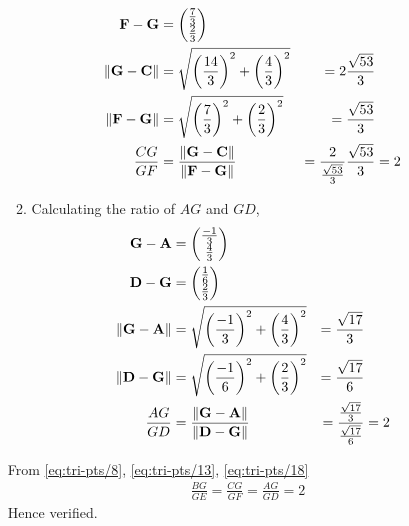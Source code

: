 \documentclass[11pt]{book}
\begin{document}
\begin{enumerate}[label=\thesection.\arabic*.,ref=\thesection.\theenumi]
\begin{enumerate}
\begin{align}
		\label{eq:tri-pts/10} \vec{F}-\vec{G} &= \myvec{\frac{7}{3} \\ \frac{2}{3}} \\
		\label{eq:tri-pts/11} \norm{\vec{G}-\vec{C}} &= \sqrt{\brak{\frac{14}{3}}^{2} + \brak{\frac{4}{3}}^{2}} &= 2\frac{\sqrt{53}}{3} \\  
		\label{eq:tri-pts/12} \norm{\vec{F}-\vec{G}} &= \sqrt{\brak{\frac{7}{3}}^{2} + \brak{\frac{2}{3}}^{2}} &= \frac{\sqrt{53}}{3} \\
		\label{eq:tri-pts/13}\frac{CG}{GF} &= \frac{\norm{\vec{G}-\vec{C}}}{\norm{\vec{F}-\vec{G}}} &= \frac2{\frac{\sqrt{53}}{3}}{\frac{\sqrt{53}}{3}} &= 2		
\end{align}
\item Calculating the ratio of $AG$ and $GD$,
\begin{align}
		\label{eq:tri-pts/14} \vec{G}-\vec{A} &= \myvec{\frac{-1}{3} \\ \frac{4}{3}} \\
		\label{eq:tri-pts/15} \vec{D}-\vec{G} &= \myvec{\frac{1}{6} \\ \frac{2}{3}} \\
		\label{eq:tri-pts/16} \norm{\vec{G}-\vec{A}} &= \sqrt{\brak{\frac{-1}{3}}^{2} + \brak{\frac{4}{3}}^{2}} &= \frac{\sqrt{17}}{3} \\
		\label{eq:tri-pts/17} \norm{\vec{D}-\vec{G}} &= \sqrt{\brak{\frac{-1}{6}}^{2}+\brak{\frac{2}{3}}^{2}} &= \frac{\sqrt{17}}{6} \\
		\label{eq:tri-pts/18}\frac{AG}{GD} &= \frac{\norm{\vec{G}-\vec{A}}}{\norm{\vec{D}-\vec{G}}} &= \frac{\frac{\sqrt{17}}{3}}{\frac{\sqrt{17}}{6}} &= 2 
\end{align}
\end{enumerate}

From \eqref{eq:tri-pts/8}, \eqref{eq:tri-pts/13}, \eqref{eq:tri-pts/18}
\begin{align}
		\frac{BG}{GE} = 
		\frac{CG}{GF} =
		\frac{AG}{GD} = 2
\end{align}
Hence verified.




\end{enumerate}
\end{document}
